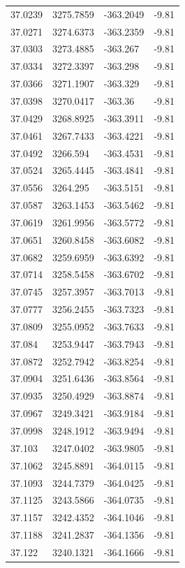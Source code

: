 \begin{table}[H]
\begin{tabular}{llll}
37.0239 & 3275.7859 & -363.2049 & -9.81 \\
37.0271 & 3274.6373 & -363.2359 & -9.81 \\
37.0303 & 3273.4885 & -363.267 & -9.81 \\
37.0334 & 3272.3397 & -363.298 & -9.81 \\
37.0366 & 3271.1907 & -363.329 & -9.81 \\
37.0398 & 3270.0417 & -363.36 & -9.81 \\
37.0429 & 3268.8925 & -363.3911 & -9.81 \\
37.0461 & 3267.7433 & -363.4221 & -9.81 \\
37.0492 & 3266.594 & -363.4531 & -9.81 \\
37.0524 & 3265.4445 & -363.4841 & -9.81 \\
37.0556 & 3264.295 & -363.5151 & -9.81 \\
37.0587 & 3263.1453 & -363.5462 & -9.81 \\
37.0619 & 3261.9956 & -363.5772 & -9.81 \\
37.0651 & 3260.8458 & -363.6082 & -9.81 \\
37.0682 & 3259.6959 & -363.6392 & -9.81 \\
37.0714 & 3258.5458 & -363.6702 & -9.81 \\
37.0745 & 3257.3957 & -363.7013 & -9.81 \\
37.0777 & 3256.2455 & -363.7323 & -9.81 \\
37.0809 & 3255.0952 & -363.7633 & -9.81 \\
37.084 & 3253.9447 & -363.7943 & -9.81 \\
37.0872 & 3252.7942 & -363.8254 & -9.81 \\
37.0904 & 3251.6436 & -363.8564 & -9.81 \\
37.0935 & 3250.4929 & -363.8874 & -9.81 \\
37.0967 & 3249.3421 & -363.9184 & -9.81 \\
37.0998 & 3248.1912 & -363.9494 & -9.81 \\
37.103 & 3247.0402 & -363.9805 & -9.81 \\
37.1062 & 3245.8891 & -364.0115 & -9.81 \\
37.1093 & 3244.7379 & -364.0425 & -9.81 \\
37.1125 & 3243.5866 & -364.0735 & -9.81 \\
37.1157 & 3242.4352 & -364.1046 & -9.81 \\
37.1188 & 3241.2837 & -364.1356 & -9.81 \\
37.122 & 3240.1321 & -364.1666 & -9.81 \\

\end{tabular}
\end{table}
